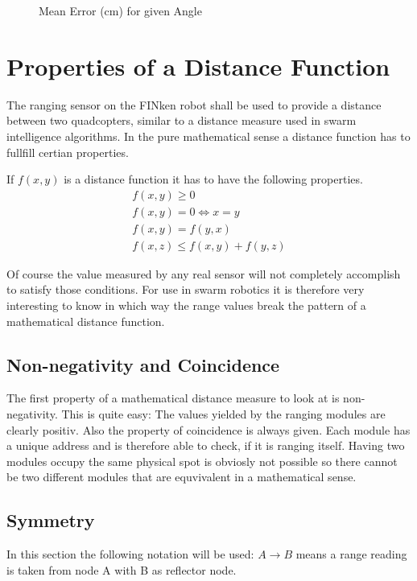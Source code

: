 \begin{figure}[h]
	\centering
	
	\caption[Mean Error for given Angle]{Mean Error (cm) for given Angle}
	\label{me_angle}
\end{figure}
\section{Properties of a Distance Function}
The ranging sensor on the FINken robot shall be used to provide a distance between two quadcopters, similar to a distance measure used in swarm intelligence algorithms.
In the pure mathematical sense a distance function has to fullfill certian properties.

If $f(x, y)$ is a distance function it has to have the following properties.
\begin{eqnarray}
f(x, y) \ge 0 \\
f(x, y) = 0 \iff x = y \\ 
f(x, y) = f(y, x) \\ 
f(x, z) \le f(x, y) + f(y, z)
\end{eqnarray}

Of course the value measured by any real sensor will not completely accomplish to satisfy those conditions.
For use in swarm robotics it is therefore very interesting to know in which way the range values break the pattern of a mathematical distance function.

\subsection{Non-negativity and Coincidence}

The first property of a mathematical distance measure to look at is non-negativity. This is quite easy: The values yielded by the ranging modules are clearly positiv.
Also the property of coincidence is always given.
Each module has a unique address and is therefore able to check, if it is ranging itself.
Having two modules occupy the same physical spot is obviosly not possible so there cannot be two different modules that are equvivalent in a mathematical sense.

\subsection{Symmetry}

In this section the following notation will be used: $A \rightarrow B$ means a range reading is taken from node A with B as reflector node.

